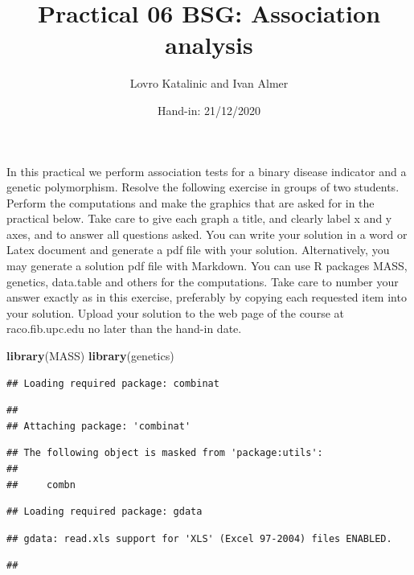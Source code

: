 \documentclass[
]{article}
\title{Practical 06 BSG: Association analysis}
\author{Lovro Katalinic and Ivan Almer}
\date{Hand-in: 21/12/2020}
\newenvironment{Shaded}{\begin{snugshade}}{\end{snugshade}}
\newcommand{\KeywordTok}[1]{\textcolor[rgb]{0.13,0.29,0.53}{\textbf{#1}}}
\newcommand{\NormalTok}[1]{#1}
\begin{document}
\maketitle

In this practical we perform association tests for a binary disease
indicator and a genetic polymorphism. Resolve the following exercise in
groups of two students. Perform the computations and make the graphics
that are asked for in the practical below. Take care to give each graph
a title, and clearly label x and y axes, and to answer all questions
asked. You can write your solution in a word or Latex document and
generate a pdf file with your solution. Alternatively, you may generate
a solution pdf file with Markdown. You can use R packages MASS,
genetics, data.table and others for the computations. Take care to
number your answer exactly as in this exercise, preferably by copying
each requested item into your solution. Upload your solution to the web
page of the course at raco.fib.upc.edu no later than the hand-in date.

\begin{Shaded}
\begin{Highlighting}[]
\KeywordTok{library}\NormalTok{(MASS)}
\KeywordTok{library}\NormalTok{(genetics)}
\end{Highlighting}
\end{Shaded}

\begin{verbatim}
## Loading required package: combinat
\end{verbatim}

\begin{verbatim}
## 
## Attaching package: 'combinat'
\end{verbatim}

\begin{verbatim}
## The following object is masked from 'package:utils':
## 
##     combn
\end{verbatim}

\begin{verbatim}
## Loading required package: gdata
\end{verbatim}

\begin{verbatim}
## gdata: read.xls support for 'XLS' (Excel 97-2004) files ENABLED.
\end{verbatim}

\begin{verbatim}
## 
\end{verbatim}
\end{document}

